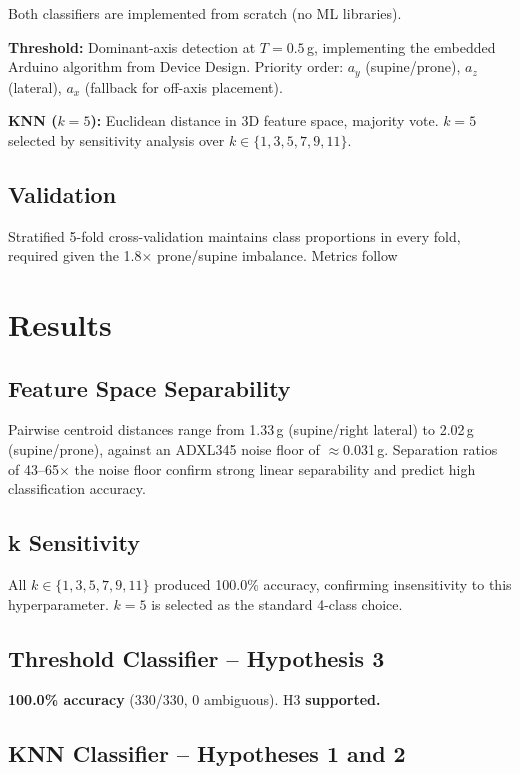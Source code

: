 \documentclass[journal]{IEEEtran}
\begin{document}
Both classifiers are implemented from scratch (no ML libraries).

\textbf{Threshold:} Dominant-axis detection at $T=0.5$\,g, implementing the embedded
Arduino algorithm from Device Design. Priority order: $a_y$ (supine/prone),
$a_z$ (lateral), $a_x$ (fallback for off-axis placement).

\textbf{KNN ($k=5$):} Euclidean distance in 3D feature space, majority vote.
$k=5$ selected by sensitivity analysis over $k\in\{1,3,5,7,9,11\}$.

\subsection{Validation}

Stratified 5-fold cross-validation  maintains class
proportions in every fold, required given the 1.8$\times$ prone/supine imbalance.
Metrics follow 

\section{Results}

\subsection{Feature Space Separability}

Pairwise centroid distances range from 1.33\,g (supine/right lateral) to
2.02\,g (supine/prone), against an ADXL345 noise floor of $\approx$0.031\,g.
Separation ratios of 43--65$\times$ the noise floor confirm strong linear
separability and predict high classification accuracy.

\subsection{k Sensitivity}

All $k\in\{1,3,5,7,9,11\}$ produced 100.0\% accuracy, confirming insensitivity
to this hyperparameter. $k=5$ is selected as the standard 4-class choice.

\subsection{Threshold Classifier -- Hypothesis 3}

\textbf{100.0\% accuracy} (330/330, 0 ambiguous). H3 \textbf{supported.}

\subsection{KNN Classifier -- Hypotheses 1 and 2}
\end{document}
